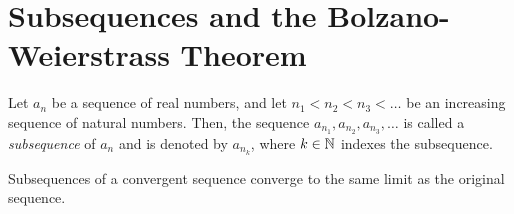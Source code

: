 


\section{Subsequences and the Bolzano-Weierstrass Theorem}

\begin{definition}
    Let \(a_n\) be a sequence of real numbers, and let \(n_1 < n_2 < n_3 < \dots\) be an increasing sequence of natural numbers. Then, the sequence \(a_{n_1}, a_{n_2}, a_{n_3}, \dots\) is called a \textit{subsequence} of \(a_n\) and is denoted by \(a_{n_k}\), where \(k \in \mathbb{N}\) indexes the subsequence.
\end{definition}

\begin{theorem}
    Subsequences of a convergent sequence converge to the same limit as the original sequence.
\end{theorem}

